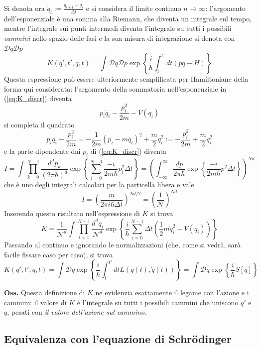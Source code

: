 Si denota ora $\dot q_i:=\frac{q_{i+1}-q_i}{\Delta t}$ e si considera il limite continuo
$n\to\infty$: l'argomento dell'esponenziale è una somma alla Riemann, che diventa un integrale sul
tempo, mentre l'integrale sui punti intermedi diventa l'integrale su tutti i possibili
\textit{cammini} nello spazio delle fasi e la sua misura di integrazione si denota con
$\mathcal{D}q\mathcal{D}p$
$$K(q',t',q,t) = \int\mathcal{D}q\mathcal{D}p\exp\left\{\frac{i}{\hbar}\int_{t}^{t'}dt(p\dot q - H)
\right\}$$
Questa espressione può essere ulteriormente semplificata per Hamiltoniane della forma qui
considerata: l'argomento della sommatoria nell'esponenziale in (\ref{eq:K_discr}) diventa
$$
p_i\dot q_i-\frac{p_i^2}{2m}-V(q_i)
$$
si completa il quadrato
$$
p_i\dot q_i-\frac{p_i^2}{2m}=-\frac{1}{2m}(p_i-m\dot q_i)^2 +\frac{m}{2}\dot q_i^2:=
-\frac{\bar p_i^2}{2m}+\frac{m}{2}\dot q_i^2
$$
e la parte dipendente dai $p_i$ di (\ref{eq:K_discr}) diventa
$$
I=\int\prod_{k=0}^{N-1}\frac{d^d\bar p_k}{(2\pi\hbar)^d}\exp\left\{\sum_{i=0}^{N-1}\frac{-i}{2m\hbar}
\bar p_i^2\Delta t\right\} = \left(\int_{-\infty}^{\infty}\frac{dp}{2\pi\hbar}\exp\left\{\frac{-i}{2m\hbar} p^2\Delta t\right\}\right)^{Nd}
$$
che è uno degli integrali calcolati per la particella libera e vale
$$I = \left(\frac{m}{2\pi i\hbar\Delta t}\right)^{Nd/2} = \left(\frac{1}{\mathcal{N}}\right)^{Nd}$$
Inserendo questo risultato nell'espressione di $K$ si trova
$$
K=\frac{1}{\mathcal{N}^d}\int\prod_{i=1}^{N-1}\frac{d^dq_i}{\mathcal{N}^d}\exp\left\{\frac{i}{\hbar}
\sum_{i=0}^{N-1}\Delta t\left(\frac{1}{2}m\dot q_i^2-V(q_i)\right)\right\}
$$
Passando al continuo e ignorando le normalizzazioni (che, come si vedrà, sarà facile fissare caso per
caso), si trova
\begin{equation}
\boxed{K(q',t',q,t)=\int\mathcal{D}q\exp\left\{\frac{i}{\hbar}\int_{t}^{t'}dtL(q(t),\dot q(t))
\right\}=\int\mathcal{D}q\exp\left\{\frac{i}{\hbar}S[q]\right\}}
\label{eq:K}
\end{equation}

\textbf{Oss.} Questa definizione di $K$ ne evidenzia esattamente il legame con l'azione e i cammini:
il valore di $K$ è l'integrale su tutti i possibili cammini che uniscono $q'$ e $q$, pesati con
\textit{il valore dell'azione sul cammino}.
\subsection{Equivalenza con l'equazione di Schrödinger}
